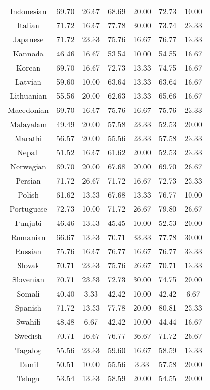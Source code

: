 \begin{table*}[]
\begin{tabular}{c|cc|cc|cc}
Indonesian & 69.70 & 26.67 & 68.69 & 20.00 & 72.73 & 10.00 \\
Italian & 71.72 & 16.67 & 77.78 & 30.00 & 73.74 & 23.33 \\
Japanese & 71.72 & 23.33 & 75.76 & 16.67 & 76.77 & 13.33 \\
Kannada & 46.46 & 16.67 & 53.54 & 10.00 & 54.55 & 16.67 \\
Korean & 69.70 & 16.67 & 72.73 & 13.33 & 74.75 & 16.67 \\
Latvian & 59.60 & 10.00 & 63.64 & 13.33 & 63.64 & 16.67 \\
Lithuanian & 55.56 & 20.00 & 62.63 & 13.33 & 65.66 & 16.67 \\
Macedonian & 69.70 & 16.67 & 75.76 & 16.67 & 75.76 & 23.33 \\
Malayalam & 49.49 & 20.00 & 57.58 & 23.33 & 52.53 & 20.00 \\
Marathi & 56.57 & 20.00 & 55.56 & 23.33 & 57.58 & 23.33 \\
Nepali & 51.52 & 16.67 & 61.62 & 20.00 & 52.53 & 23.33 \\
Norwegian & 69.70 & 20.00 & 67.68 & 20.00 & 69.70 & 26.67 \\
Persian & 71.72 & 26.67 & 71.72 & 16.67 & 72.73 & 23.33 \\
Polish & 61.62 & 13.33 & 67.68 & 13.33 & 76.77 & 10.00 \\
Portuguese & 72.73 & 10.00 & 71.72 & 26.67 & 79.80 & 26.67 \\
Punjabi & 46.46 & 13.33 & 45.45 & 10.00 & 52.53 & 20.00 \\
Romanian & 66.67 & 13.33 & 70.71 & 33.33 & 77.78 & 30.00 \\
Russian & 75.76 & 16.67 & 76.77 & 16.67 & 76.77 & 33.33 \\
Slovak & 70.71 & 23.33 & 75.76 & 26.67 & 70.71 & 13.33 \\
Slovenian & 70.71 & 23.33 & 72.73 & 30.00 & 74.75 & 20.00 \\
Somali & 40.40 & 3.33 & 42.42 & 10.00 & 42.42 & 6.67 \\
Spanish & 71.72 & 13.33 & 77.78 & 20.00 & 80.81 & 23.33 \\
Swahili & 48.48 & 6.67 & 42.42 & 10.00 & 44.44 & 16.67 \\
Swedish & 70.71 & 16.67 & 76.77 & 36.67 & 71.72 & 26.67 \\
Tagalog & 55.56 & 23.33 & 59.60 & 16.67 & 58.59 & 13.33 \\
Tamil & 50.51 & 10.00 & 55.56 & 3.33 & 57.58 & 20.00 \\
Telugu & 53.54 & 13.33 & 58.59 & 20.00 & 54.55 & 20.00 \\

\end{tabular}
\end{table*}
